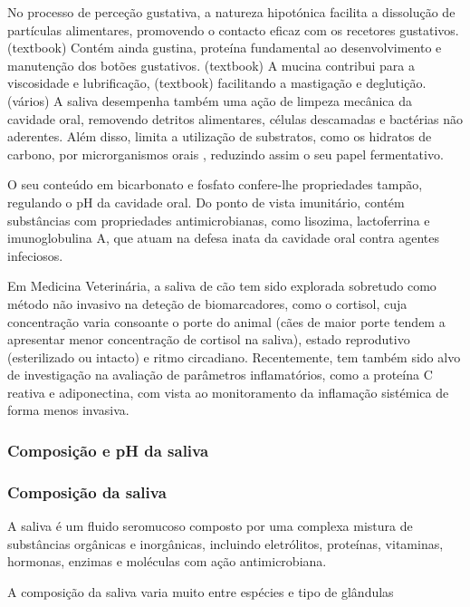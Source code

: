 No processo de perceção gustativa, a natureza hipotónica facilita a dissolução de partículas alimentares, promovendo o contacto eficaz com os recetores gustativos. (textbook) Contém ainda gustina, proteína fundamental ao desenvolvimento e manutenção dos botões gustativos. (textbook) A mucina contribui para a viscosidade e lubrificação, (textbook) facilitando a mastigação e deglutição. (vários) 
A saliva desempenha também uma ação de limpeza mecânica da cavidade oral, removendo detritos alimentares, células descamadas e bactérias não aderentes. Além disso, limita a utilização de substratos, como os hidratos de carbono, por microrganismos orais , reduzindo assim o seu papel fermentativo.


O seu conteúdo em bicarbonato e fosfato confere-lhe propriedades tampão, regulando o pH da cavidade oral.
Do ponto de vista imunitário, contém substâncias com propriedades antimicrobianas, como lisozima, lactoferrina e imunoglobulina A, que atuam na defesa inata da cavidade oral contra agentes infeciosos. \cite{Junqueira}


Em Medicina Veterinária, a saliva de cão tem sido explorada sobretudo como método não invasivo na deteção de biomarcadores, como o cortisol, cuja concentração varia consoante o porte do animal (cães de maior porte tendem a apresentar menor concentração de cortisol na saliva), estado reprodutivo (esterilizado ou intacto) e ritmo circadiano.\cite{serial,Pasha2018} Recentemente, tem também sido alvo de investigação na avaliação de parâmetros inflamatórios, como a proteína C reativa e adiponectina, com vista ao monitoramento da inflamação sistémica de forma menos invasiva.\cite{Pasha2018} 

\subsubsection{Composição e pH da saliva}

\subsubsection{Composição da saliva}

A saliva é um fluido seromucoso composto por uma complexa mistura de substâncias orgânicas e inorgânicas, incluindo eletrólitos, proteínas, vitaminas, hormonas, enzimas e moléculas com ação antimicrobiana. \cite{lemmons2018}

A composição da saliva varia muito entre espécies e tipo de glândulas \cite{textbookphysio}

